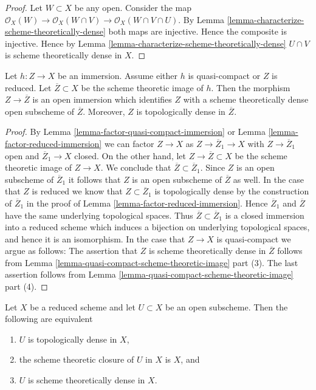 \begin{proof}
Let $W \subset X$ be any open.
Consider the map
$\mathcal{O}_X(W) \to \mathcal{O}_X(W \cap V)
\to \mathcal{O}_X(W \cap V \cap U)$.
By Lemma \ref{lemma-characterize-scheme-theoretically-dense}
both maps are injective. Hence the composite is injective.
Hence by Lemma \ref{lemma-characterize-scheme-theoretically-dense}
$U \cap V$ is scheme theoretically dense in $X$.
\end{proof}

\begin{lemma}
\label{lemma-quasi-compact-immersion}
Let $h : Z \to X$ be an immersion. Assume either $h$ is quasi-compact
or $Z$ is reduced. Let $\overline{Z} \subset X$ be the scheme theoretic
image of $h$. Then the morphism $Z \to \overline{Z}$ is an open immersion
which identifies $Z$ with a scheme theoretically dense open
subscheme of $\overline{Z}$. Moreover, $Z$ is topologically
dense in $\overline{Z}$.
\end{lemma}

\begin{proof}
By Lemma \ref{lemma-factor-quasi-compact-immersion} or
Lemma \ref{lemma-factor-reduced-immersion} we can factor
$Z \to X$ as $Z \to \overline{Z}_1 \to X$ with $Z \to \overline{Z}_1$
open and $\overline{Z}_1 \to X$ closed. On the other hand, let
$Z \to \overline{Z} \subset X$ be the scheme theoretic image of
$Z \to X$. We conclude that $\overline{Z} \subset \overline{Z}_1$.
Since $Z$ is an open subscheme of $\overline{Z}_1$ it follows
that $Z$ is an open subscheme of $\overline{Z}$ as well.
In the case that $Z$ is reduced we know that $Z \subset \overline{Z}_1$
is topologically dense by the construction of $\overline{Z}_1$ in
the proof of Lemma \ref{lemma-factor-reduced-immersion}.
Hence $\overline{Z}_1$ and $\overline{Z}$ have the same
underlying topological spaces. Thus $\overline{Z} \subset \overline{Z}_1$
is a closed immersion into a reduced scheme which induces a bijection
on underlying topological spaces, and hence it is an isomorphism.
In the case that $Z \to X$ is quasi-compact we argue as follows:
The assertion that $Z$ is scheme theoretically dense in
$\overline{Z}$ follows from
Lemma \ref{lemma-quasi-compact-scheme-theoretic-image} part (3).
The last assertion follows from
Lemma \ref{lemma-quasi-compact-scheme-theoretic-image} part (4).
\end{proof}

\begin{lemma}
\label{lemma-reduced-scheme-theoretically-dense}
Let $X$ be a reduced scheme and let $U \subset X$ be an open subscheme.
Then the following are equivalent
\begin{enumerate}
\item $U$ is topologically dense in $X$,
\item the scheme theoretic closure of $U$ in $X$ is $X$, and
\item $U$ is scheme theoretically dense in $X$.
\end{enumerate}
\end{lemma}

